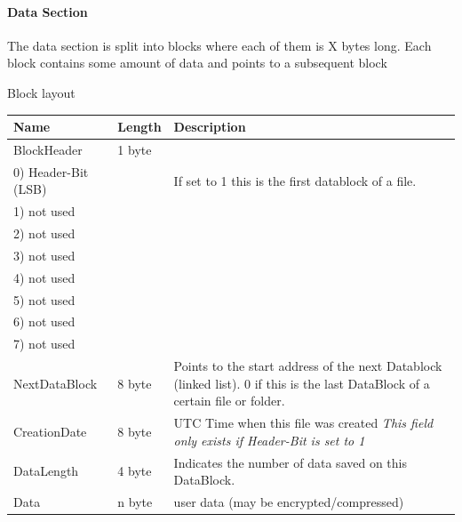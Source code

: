 \paragraph{Data Section}
The data section is split into blocks where each of them is X bytes long.
Each block contains some amount of data and points to a subsequent block


Block layout \\

\begin{tabular}{|l|l|p{5cm}|}
\hline
  \textbf{Name} & \textbf{Length} & \textbf{Description}
\\  \hline
 BlockHeader & 1 byte & 
 \\
 \hspace{0.2cm} 0) Header-Bit (LSB) & &  If set to 1 this is the first datablock
 of a file.
 \\ 
 \hspace{0.2cm} 1) not used & &  
 \\ 
 \hspace{0.2cm} 2) not used & &  
 \\ 
 \hspace{0.2cm} 3) not used & &  
 \\ 
 \hspace{0.2cm} 4) not used & &  
 \\ 
 \hspace{0.2cm} 5) not used & &  
 \\ 
 \hspace{0.2cm} 6) not used & &  
 \\ 
 \hspace{0.2cm} 7) not used & &  
 
\\  \hline
 NextDataBlock & 8 byte & 
 Points to the start address of the next Datablock (linked list).
    0 if this is the last DataBlock of a certain file or folder.
\\  \hline
  CreationDate & 8 byte & UTC Time when this file was created
  \newline \textit{This field only exists if Header-Bit is set to 1}
\\  \hline

  DataLength & 4 byte &
    Indicates the number of data saved on this DataBlock.
    
\\  \hline
 Data & n byte & user data (may be encrypted/compressed)
\\  \hline
\end{tabular}


